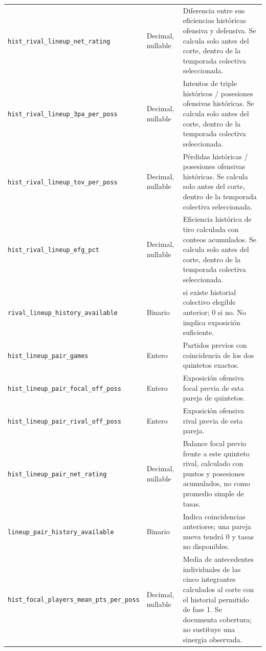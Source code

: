 \begin{longtable}{@{}>{\raggedright\arraybackslash}p{5.0cm}>{\raggedright\arraybackslash}p{1.9cm}>{\raggedright\arraybackslash}p{7.7cm}@{}}
\texttt{hist\_\allowbreak rival\_\allowbreak lineup\_\allowbreak net\_\allowbreak rating} & Decimal, nullable & Diferencia entre sus eficiencias históricas ofensiva y defensiva. Se calcula solo antes del corte, dentro de la temporada colectiva seleccionada.\\
\texttt{hist\_\allowbreak rival\_\allowbreak lineup\_\allowbreak 3pa\_\allowbreak per\_\allowbreak poss} & Decimal, nullable & Intentos de triple históricos / posesiones ofensivas históricas. Se calcula solo antes del corte, dentro de la temporada colectiva seleccionada.\\
\texttt{hist\_\allowbreak rival\_\allowbreak lineup\_\allowbreak tov\_\allowbreak per\_\allowbreak poss} & Decimal, nullable & Pérdidas históricas / posesiones ofensivas históricas. Se calcula solo antes del corte, dentro de la temporada colectiva seleccionada.\\
\texttt{hist\_\allowbreak rival\_\allowbreak lineup\_\allowbreak efg\_\allowbreak pct} & Decimal, nullable & Eficiencia histórica de tiro calculada con conteos acumulados. Se calcula solo antes del corte, dentro de la temporada colectiva seleccionada.\\
\texttt{rival\_\allowbreak lineup\_\allowbreak history\_\allowbreak available} & Binario & 1 si existe historial colectivo elegible anterior; 0 si no. No implica exposición suficiente.\\
\texttt{hist\_\allowbreak lineup\_\allowbreak pair\_\allowbreak games} & Entero & Partidos previos con coincidencia de los dos quintetos exactos.\\
\texttt{hist\_\allowbreak lineup\_\allowbreak pair\_\allowbreak focal\_\allowbreak off\_\allowbreak poss} & Entero & Exposición ofensiva focal previa de esta pareja de quintetos.\\
\texttt{hist\_\allowbreak lineup\_\allowbreak pair\_\allowbreak rival\_\allowbreak off\_\allowbreak poss} & Entero & Exposición ofensiva rival previa de esta pareja.\\
\texttt{hist\_\allowbreak lineup\_\allowbreak pair\_\allowbreak net\_\allowbreak rating} & Decimal, nullable & Balance focal previo frente a este quinteto rival, calculado con puntos y posesiones acumulados, no como promedio simple de tasas.\\
\texttt{lineup\_\allowbreak pair\_\allowbreak history\_\allowbreak available} & Binario & Indica coincidencias anteriores; una pareja nueva tendrá 0 y tasas no disponibles.\\
\texttt{hist\_\allowbreak focal\_\allowbreak players\_\allowbreak mean\_\allowbreak pts\_\allowbreak per\_\allowbreak poss} & Decimal, nullable & Media de antecedentes individuales de las cinco integrantes calculados al corte con el historial permitido de fase 1. Se documenta cobertura; no sustituye una sinergia observada.\\

\end{longtable}
